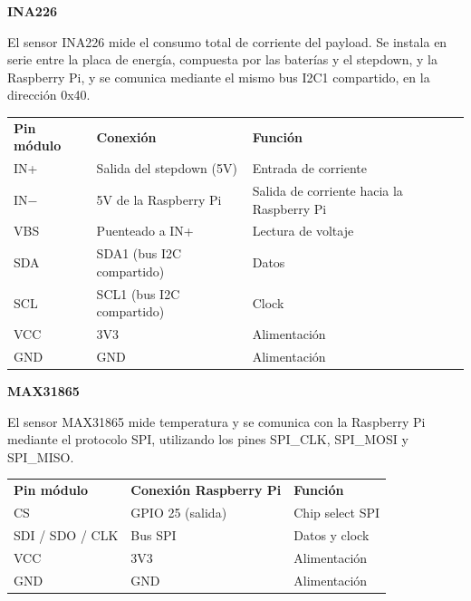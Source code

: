 \documentclass[12pt,a4paper]{article}
\newcounter{none} %
\begin{document}
\textbf{INA226}

El sensor INA226 mide el consumo total de corriente del payload. Se instala en serie entre la placa de energía, compuesta por las baterías y el stepdown, y la Raspberry Pi, y se comunica mediante el mismo bus I2C1 compartido, en la dirección 0x40.

{\def\LTcaptype{none} %
\begin{longtable}[]{@{}
  >{\centering\arraybackslash}p{}
  >{\centering\arraybackslash}p{}
  >{\centering\arraybackslash}p{}@{}}
\toprule\noalign{}
\endhead
\bottomrule\noalign{}
\endlastfoot
\textbf{Pin módulo} & \textbf{Conexión} & \textbf{Función} \\
IN+ & Salida del stepdown (5V) & Entrada de corriente \\
IN− & 5V de la Raspberry Pi & Salida de corriente hacia la Raspberry Pi \\
VBS & Puenteado a IN+ & Lectura de voltaje \\
SDA & SDA1 (bus I2C compartido) & Datos \\
SCL & SCL1 (bus I2C compartido) & Clock \\
VCC & 3V3 & Alimentación \\
GND & GND & Alimentación \\
\end{longtable}
}

\textbf{MAX31865}

El sensor MAX31865 mide temperatura y se comunica con la Raspberry Pi mediante el protocolo SPI, utilizando los pines SPI\_CLK, SPI\_MOSI y SPI\_MISO.

{\def\LTcaptype{none} %
\begin{longtable}[]{@{}
  >{\centering\arraybackslash}p{}
  >{\centering\arraybackslash}p{}
  >{\centering\arraybackslash}p{}@{}}
\toprule\noalign{}
\endhead
\bottomrule\noalign{}
\endlastfoot
\textbf{Pin módulo} & \textbf{Conexión Raspberry Pi} & \textbf{Función} \\
CS & GPIO 25 (salida) & Chip select SPI \\
SDI / SDO / CLK & Bus SPI & Datos y clock \\
VCC & 3V3 & Alimentación \\
GND & GND & Alimentación \\
\end{longtable}
}
\end{document}
